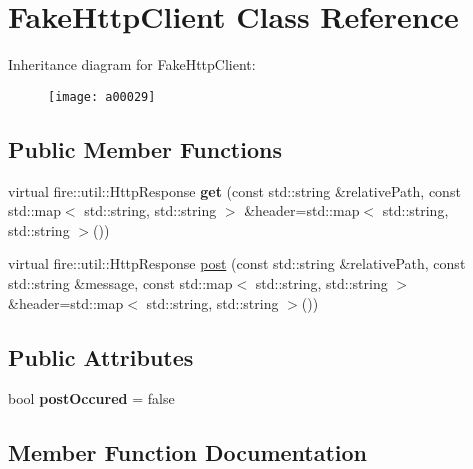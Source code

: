 \hypertarget{a00029}{}\section{Fake\+Http\+Client Class Reference}
\label{a00029}
Inheritance diagram for Fake\+Http\+Client\+:\begin{figure}[H]
\begin{center}
\leavevmode
\texttt{[image: a00029]}
\end{center}
\end{figure}
\subsection*{Public Member Functions}
\begin{DoxyCompactItemize}
\item 
virtual fire\+::util\+::\+Http\+Response {\bfseries get} (const std\+::string \&relative\+Path, const std\+::map$<$ std\+::string, std\+::string $>$ \&header=std\+::map$<$ std\+::string, std\+::string $>$())\hypertarget{a00029_aa69081dbfa2351dbc9d01434df577568}{}\label{a00029_aa69081dbfa2351dbc9d01434df577568}

\item 
virtual fire\+::util\+::\+Http\+Response \hyperlink{a00029_af775ada9f2a4e0939f06b733acb5e8ed}{post} (const std\+::string \&relative\+Path, const std\+::string \&message, const std\+::map$<$ std\+::string, std\+::string $>$ \&header=std\+::map$<$ std\+::string, std\+::string $>$())
\end{DoxyCompactItemize}
\subsection*{Public Attributes}
\begin{DoxyCompactItemize}
\item 
bool {\bfseries post\+Occured} = false\hypertarget{a00029_aa4f56c4906c5c5654f05778b97860441}{}\label{a00029_aa4f56c4906c5c5654f05778b97860441}

\end{DoxyCompactItemize}


\subsection{Member Function Documentation}
